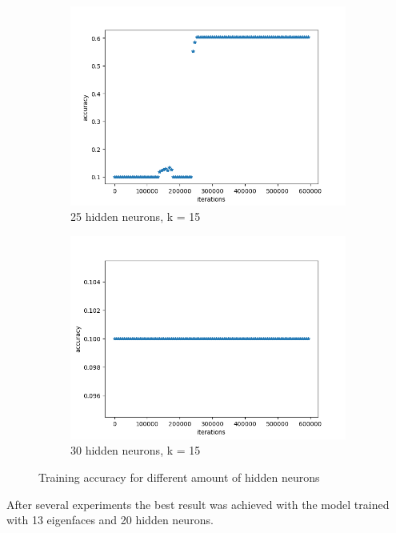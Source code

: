 \begin{figure}[H]
\centering
\begin{subfigure}[b]{.45\linewidth}
\includegraphics[width=\linewidth]{img/tests/lwf/40ppl/PCA_MLPk15h25}
\caption{25 hidden neurons, k = 15}
\end{subfigure}
\begin{subfigure}[b]{.45\linewidth}
\includegraphics[width=\linewidth]{img/tests/lwf/40ppl/PCA_MLPk15h35.png}
\caption{30 hidden neurons, k = 15}
\end{subfigure}
\caption{Training accuracy for different amount of hidden neurons}
\end{figure}


After several experiments the best result was achieved with the model trained with 13 eigenfaces and 20 hidden neurons.


